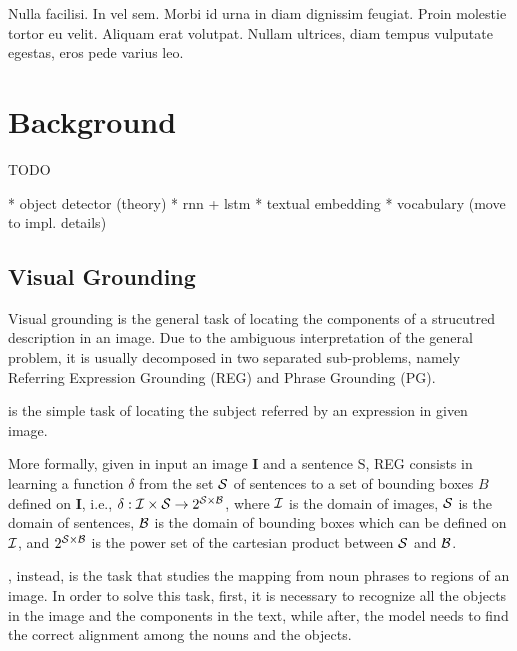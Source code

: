 
\begin{savequote}[75mm]
Nulla facilisi. In vel sem. Morbi id urna in diam dignissim feugiat. Proin molestie tortor eu velit. Aliquam erat volutpat. Nullam ultrices, diam tempus vulputate egestas, eros pede varius leo.
\end{savequote}

\chapter{Background}

TODO

* object detector (theory)
* rnn + lstm
* textual embedding
* vocabulary (move to impl. details)

\section{Visual Grounding}
\label{sec:visual-grounding}

Visual grounding is the general task of locating the components of a
strucutred description in an image. Due to the ambiguous
interpretation of the general problem, it is usually decomposed in two
separated sub-problems, namely Referring Expression Grounding (REG)
and Phrase Grounding (PG).

 is the simple task of
locating the subject referred by an expression in given image.

More formally, given in input an image $\bm{I}$ and a sentence
$\mathrm{S}$, REG consists in learning a function $\delta$ from the
set $\mathcal{S}$ of sentences to a set of bounding boxes $B$ defined on
$\bm{I}$, i.e., $\delta: \mathcal{I} \times \mathcal{S} \rightarrow 2^{\mathcal{S}
\times \mathcal{B}}$, where $\mathcal{I}$ is the domain of images, $\mathcal{S}$ is the
domain of sentences, $\mathcal{B}$ is the domain of bounding boxes which can
be defined on $\mathcal{I}$, and $2^{\mathcal{S} \times \mathcal{B}}$ is the power set
of the cartesian product between $\mathcal{S}$ and $\mathcal{B}$.

, instead, is the task that studies the
mapping from noun phrases to regions of an image. In order to solve
this task, first, it is necessary to recognize all the objects in the
image and the components in the text, while after, the model needs to
find the correct alignment among the nouns and the objects.

